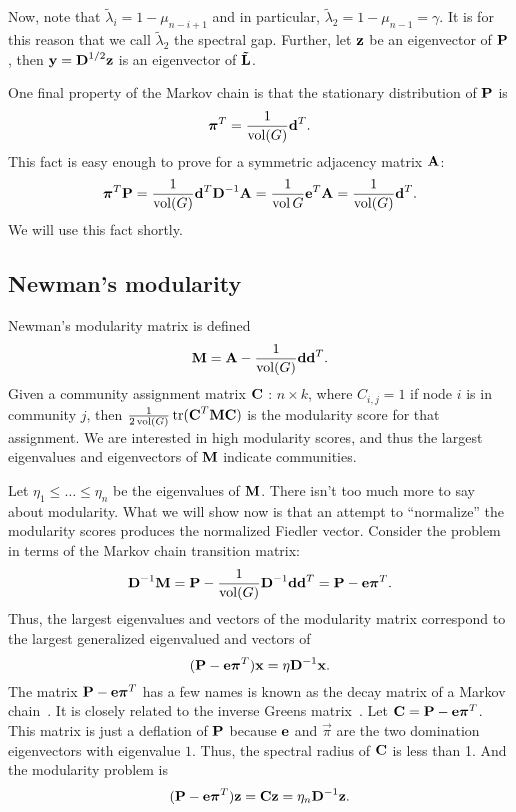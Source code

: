 \documentclass[nofonts]{dgleich-article}
\DeclareMathOperator{\trace}{tr}
\DeclareMathOperator{\vol}{vol}
\newcommand{\mnL}{\mat{\tilde{L}}}
\newcommand{\tlambda}{\tilde{\lambda}}
\renewcommand{\vpi}{\vec{\pi}}
\begin{document}
Now, note that $\tlambda_i = 1 - \mu_{n-i+1}$ and in particular, $\tlambda_2 = 1 - \mu_{n-1} = \gamma$. 
It is for this reason that we call $\tlambda_2$ the spectral gap.  
Further, let $\boldsymbol{\mathrm{z}}$ be an eigenvector of $\boldsymbol{\mathrm{P}}$, then 
$\boldsymbol{\mathrm{y}} = \boldsymbol{\mathrm{D}}^{1/2} \boldsymbol{\mathrm{z}}$ is an eigenvector of $\mnL$.  

One final property of the Markov chain is that the stationary distribution of 
$\boldsymbol{\mathrm{P}}$ is \[ \vpi^T = \frac{1}{\vol(G)} \vd^T. \]
This fact is easy enough to prove for a symmetric adjacency matrix $\boldsymbol{\mathrm{A}}$:
\[ \vpi^T \mP = \frac{1}{\vol(G)} \vd^T \mD^{-1} \mA = \frac{1}{\vol{G}} \ve^T \mA = \frac{1}{\vol(G)} \vd^T. \]
We will use this fact shortly.

\subsection{Newman's modularity}

Newman's modularity matrix is defined 
\[ \mM = \mA - \frac{1}{\vol(G)} \vd \vd^T. \]
Given a community assignment matrix 
$\boldsymbol{\mathrm{C}}$ : $n \times k$, where $C_{i,j} = 1$ if node $i$ is in community
$j$, then $\frac{1}{2 \vol(G)} \trace ( \mC^T \mM \mC )$ is the
modularity score for that assignment.  We are interested
in high modularity scores, and thus the largest eigenvalues
and eigenvectors of $\boldsymbol{\mathrm{M}}$ indicate communities.  

Let $\eta_1 \le \ldots \le \eta_n$ be the eigenvalues of $\boldsymbol{\mathrm{M}}$.  There
isn't too much more to say about modularity.  What we will show now
is that an attempt to ``normalize'' the modularity scores produces
the normalized Fiedler vector.  Consider the problem in terms
of the Markov chain transition matrix: 
\[ \mD^{-1} \mM = \mP - \frac{1}{\vol(G)} \mD^{-1} \vd \vd^T = \mP - \ve \vpi^T. \]
Thus, the largest eigenvalues and vectors of the modularity matrix correspond
to the largest generalized eigenvalued and vectors of 
\[ (\mP - \ve \vpi^T) \vx = \eta \mD^{-1} \vx. \]
The matrix $\mP - \ve \vpi^T$ has a few names is known as
the decay matrix of a Markov chain~\cite{jonsson1997-cutoff}.
It is closely related to the inverse Greens 
matrix~\cite{ollivier2007-greens}.  Let $\mC = \mP - \ve \vpi^T$.
This matrix is just a deflation of $\boldsymbol{\mathrm{P}}$ because $\boldsymbol{\mathrm{e}}$ and $\vpi$
are the two domination eigenvectors with eigenvalue $1$.
Thus, the spectral radius of $\boldsymbol{\mathrm{C}}$ is less than 1.  And 
the modularity problem is 
\[ (\mP - \ve \vpi^T) \vz = \mC \vz = \eta_n \mD^{-1} \vz. \]
\end{document}
